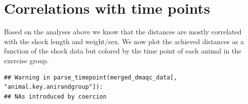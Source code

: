 \documentclass[]{article}
\newenvironment{Shaded}{\begin{snugshade}}{\end{snugshade}}
\newcommand{\KeywordTok}[1]{\textcolor[rgb]{0.13,0.29,0.53}{\textbf{#1}}}
\newcommand{\DataTypeTok}[1]{\textcolor[rgb]{0.13,0.29,0.53}{#1}}
\newcommand{\DecValTok}[1]{\textcolor[rgb]{0.00,0.00,0.81}{#1}}
\newcommand{\StringTok}[1]{\textcolor[rgb]{0.31,0.60,0.02}{#1}}
\newcommand{\CommentTok}[1]{\textcolor[rgb]{0.56,0.35,0.01}{\textit{#1}}}
\newcommand{\ControlFlowTok}[1]{\textcolor[rgb]{0.13,0.29,0.53}{\textbf{#1}}}
\newcommand{\OperatorTok}[1]{\textcolor[rgb]{0.81,0.36,0.00}{\textbf{#1}}}
\newcommand{\NormalTok}[1]{#1}
\begin{document}
\section{Correlations with time
points}\label{correlations-with-time-points}

Based on the analyses above we know that the distances are mostly
correlated with the shock length and weight/sex. We now plot the
achieved distances as a function of the shock data but colored by the
time point of each animal in the exercise group.

\begin{Shaded}
\end{Shaded}

\begin{verbatim}
## Warning in parse_timepoint(merged_dmaqc_data[, "animal.key.anirandgroup"]):
## NAs introduced by coercion
\end{verbatim}
\end{document}
